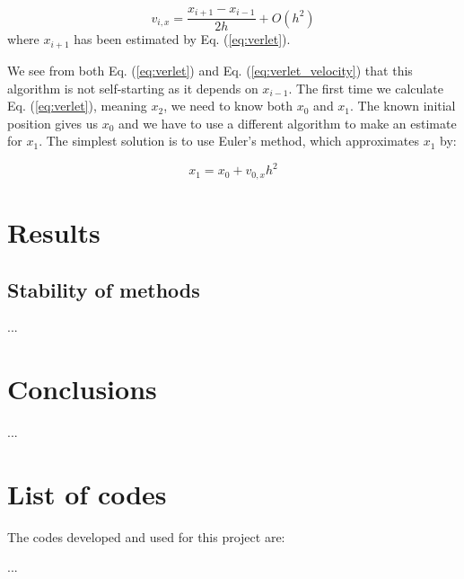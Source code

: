 \documentclass{article}
\begin{document}
\begin{multicols}{2}
\begin{equation}\label{eq:verlet_velocity}
	v_{i,x} = \frac{x_{i+1} - x_{i-1}}{2h} + O(h^2)
\end{equation}
where $x_{i+1}$ has been estimated by Eq. (\ref{eq:verlet}). 

We see from both Eq. (\ref{eq:verlet}) and Eq. (\ref{eq:verlet_velocity}) that this algorithm is not self-starting as it depends on $x_{i-1}$. The first time we calculate Eq. (\ref{eq:verlet}), meaning $x_2$, we need to know both $x_0$ and $x_1$. The known initial position gives us $x_0$ and we have to use a different algorithm to make an estimate for $x_1$. The simplest solution is to use Euler's method, which approximates $x_1$ by:

\begin{equation}
	x_1 = x_0 + v_{0,x} h^2
\end{equation}



\section{Results}

\subsection{Stability of methods}
...


\section{Conclusions}

...




\section{List of codes}

The codes developed and used for this project are:\

...

\end{multicols}
\end{document}
